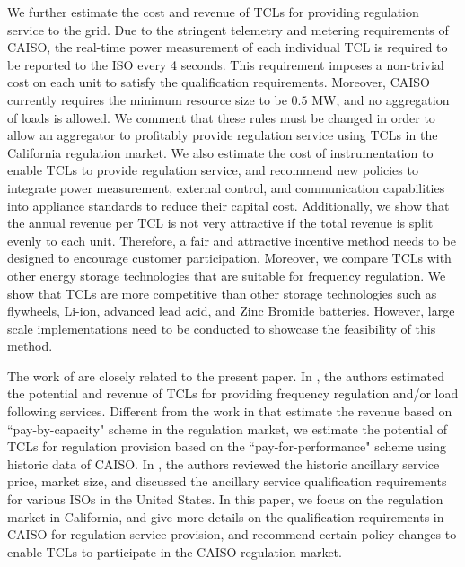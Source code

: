 \documentclass[onecolumn,journal]{IEEEtran}
\begin{document}
We further estimate the cost and revenue of \acp{TCL} for providing regulation service to the grid. Due to the stringent telemetry and metering requirements of \ac{CAISO}, the real-time power measurement of each individual \ac{TCL} is required to be reported to the ISO every 4 seconds. This requirement imposes a non-trivial cost on each unit to satisfy the qualification requirements. Moreover, CAISO currently requires the minimum resource size to be $0.5$ MW, and no aggregation of loads is allowed. We comment that these rules must be changed in order to allow an aggregator to profitably provide regulation service using TCLs in the California regulation market. We also estimate the cost of instrumentation to enable TCLs to provide regulation service, and recommend new policies to integrate power measurement, external control, and communication capabilities into appliance standards to reduce their capital cost. Additionally, we show that the annual revenue per \ac{TCL} is not very attractive if the total revenue is split evenly to each unit.  Therefore, a fair and attractive incentive method needs to be designed to encourage customer participation.  Moreover, we compare \acp{TCL} with other energy storage technologies that are suitable for frequency regulation. We show that \acp{TCL} are more competitive than other storage technologies such as flywheels, Li-ion, advanced lead acid, and Zinc Bromide batteries. However, large scale implementations need to be conducted to showcase the feasibility of this method. 


The work of \cite{mathieu_revenue, HH_BS_KP_TV_ACC:2014,macdonald2012demand} are closely related to the present paper. In \cite{mathieu_revenue,HH_BS_KP_TV_ACC:2014}, the authors estimated the potential and revenue of \acp{TCL} for providing frequency regulation and/or load following services. Different from the work in \cite{mathieu_revenue,HH_BS_KP_TV_ACC:2014} that estimate the revenue based on ``pay-by-capacity" scheme in the regulation market, we estimate the potential of TCLs for regulation provision based on the ``pay-for-performance" scheme using historic data of \ac{CAISO}. In \cite{macdonald2012demand}, the authors reviewed the historic ancillary service price, market size, and discussed the ancillary service qualification requirements for various ISOs in the United States. In this paper,  we focus on the regulation market in California, and give more details on the qualification requirements in CAISO for regulation service provision, and recommend certain policy changes to enable TCLs to participate in the CAISO regulation market. 
\end{document}
